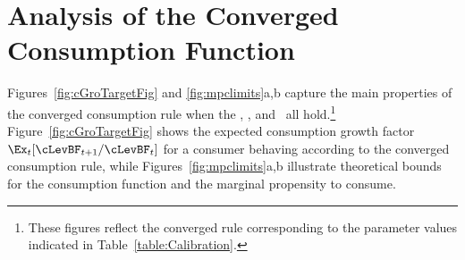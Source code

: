 \documentclass[./BufferStockTheory.tex]{subfiles}
\begin{document}
\begin{comment}
The precautionary motive induced by the noncapital income risk can be
thought of as being like a smoothed version of liquidity constraints.
As cash declines toward zero, the size of the risk relative to the
size of cash increases, which means that the relative variation in
consumption increases, which means that the intensity of the
precautionary motive increases.  For a more rigorous and detailed
treatment of the relationship between precautionary saving and
liquidity constraints, see Carroll and
Kimball~\citeyearpar{carroll&kimball:liquidity}.
\end{comment}

\hypertarget{AnalysisoftheConvergedConsumptionFunction}{}
\section{Analysis of the Converged Consumption Function}

Figures~\ref{fig:cGroTargetFig} and \ref{fig:mpclimits}a,b capture the
main properties of the converged consumption rule when the \RIC, \GIC,
and \FHWC~all hold.\footnote{These figures reflect the converged rule
  corresponding to the parameter values indicated in
  Table~\ref{table:Calibration}.}  Figure~\ref{fig:cGroTargetFig}
shows the expected consumption growth factor
$\Ex_{t}[\cLevBF_{t+1}/\cLevBF_{t}]$ for a consumer behaving according to
the converged consumption rule, while Figures~\ref{fig:mpclimits}a,b
illustrate theoretical bounds for the consumption function and the
marginal propensity to consume.
\end{document}
